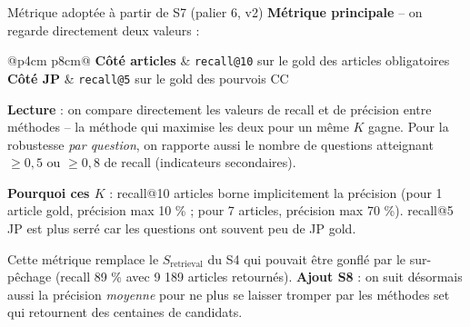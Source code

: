 \documentclass[aspectratio=169,10pt]{beamer}
\newcommand{\keybox}[1]{%
  \begin{center}
  \colorbox{accentsoft}{\parbox{0.92\linewidth}{\centering #1}}
  \end{center}}
\begin{document}
\begin{frame}{Métrique adoptée à partir de S7 (palier 6, v2)}
  \footnotesize
  \textbf{Métrique principale} -- on regarde directement deux valeurs :

  \vspace{0.5em}
  \begin{center}
  \renewcommand{\arraystretch}{1.4}
  \begin{tabular}{@{}p{4cm} p{8cm}@{}}
    \toprule
    \textbf{Côté articles} & \texttt{recall@10} sur le gold des articles obligatoires \\
    \textbf{Côté JP}       & \texttt{recall@5} sur le gold des pourvois CC \\
    \bottomrule
  \end{tabular}
  \end{center}

  \vspace{0.5em}
  \textbf{Lecture} : on compare directement les valeurs de recall et de précision entre méthodes -- la méthode qui maximise les deux pour un même $K$ gagne.
  Pour la robustesse \emph{par question}, on rapporte aussi le nombre de questions atteignant
  $\geq 0{,}5$ ou $\geq 0{,}8$ de recall (indicateurs secondaires).

  \vspace{0.5em}
  \textbf{Pourquoi ces $K$} : recall@10 articles borne implicitement la précision (pour 1 article gold, précision max 10 \% ; pour 7 articles, précision max 70 \%). recall@5 JP est plus serré car les questions ont souvent peu de JP gold.

  \vspace{0.5em}
  \keybox{Cette métrique remplace le \(S_{\text{retrieval}}\) du S4 qui pouvait être gonflé par le sur-pêchage (recall 89 \% avec 9 189 articles retournés). \textbf{Ajout S8} : on suit désormais aussi la précision \emph{moyenne} pour ne plus se laisser tromper par les méthodes set qui retournent des centaines de candidats.}
\end{frame}
\end{document}
